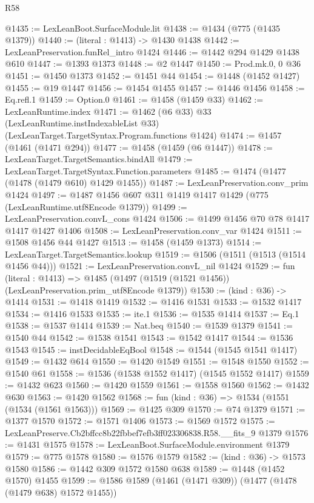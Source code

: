 \begin{lexlean}{R58}
\begin{coremodule}
{{@1435 := LexLeanBoot.SurfaceModule.lit
@1438 := @1434 (@775 (@1435 @1379))
@1440 := (literal : @1413) -> @1430 @1438
@1442 := LexLeanPreservation.funRel_intro @1424
@1446 := @1442 @294 @1429 @1438 @610
@1447 := @1393 @1373
@1448 := @2 @1447
@1450 := Prod.mk.{0, 0} @36
@1451 := @1450 @1373
@1452 := @1451 @44
@1454 := @1448 (@1452 @1427)
@1455 := @19 @1447
@1456 := @1454 @1455
@1457 := @1446 @1456
@1458 := Eq.refl.{1}
@1459 := Option.{0}
@1461 := @1458 (@1459 @33)
@1462 := LexLeanRuntime.index
@1471 := @1462
    (@6 @33)
    @33
    (LexLeanRuntime.instIndexableList @33)
    (LexLeanTarget.TargetSyntax.Program.functions @1424)
@1474 := @1457 (@1461 (@1471 @294))
@1477 := @1458 (@1459 (@6 @1447))
@1478 := LexLeanTarget.TargetSemantics.bindAll
@1479 := LexLeanTarget.TargetSyntax.Function.parameters
@1485 := @1474 (@1477 (@1478 (@1479 @610) @1429 @1455))
@1487 := LexLeanPreservation.conv_prim @1424
@1497 := @1487 @1456 @607 @311 @1419 @1417 @1429 (@775 (LexLeanRuntime.utf8Encode @1379))
@1499 := LexLeanPreservation.convL_cons @1424
@1506 := @1499 @1456 @70 @78 @1417 @1417 @1427 @1406
@1508 := LexLeanPreservation.conv_var @1424
@1511 := @1508 @1456 @44 @1427
@1513 := @1458 (@1459 @1373)
@1514 := LexLeanTarget.TargetSemantics.lookup
@1519 := @1506 (@1511 (@1513 (@1514 @1456 @44)))
@1521 := LexLeanPreservation.convL_nil @1424
@1529 := fun (literal : @1413) =>
  @1485 (@1497 (@1519 (@1521 @1456)) (LexLeanPreservation.prim_utf8Encode @1379))
@1530 := (kind : @36) -> @1414
@1531 := @1418 @1419
@1532 := @1416 @1531
@1533 := @1532 @1417
@1534 := @1416 @1533
@1535 := ite.{1}
@1536 := @1535 @1414
@1537 := Eq.{1}
@1538 := @1537 @1414
@1539 := Nat.beq
@1540 := @1539 @1379
@1541 := @1540 @44
@1542 := @1538 @1541
@1543 := @1542 @1417
@1544 := @1536 @1543
@1545 := instDecidableEqBool
@1548 := @1544 (@1545 @1541 @1417)
@1549 := @1432 @614
@1550 := @1420 @1549
@1551 := @1548 @1550
@1552 := @1540 @61
@1558 := @1536 (@1538 @1552 @1417) (@1545 @1552 @1417)
@1559 := @1432 @623
@1560 := @1420 @1559
@1561 := @1558 @1560
@1562 := @1432 @630
@1563 := @1420 @1562
@1568 := fun (kind : @36) => @1534 (@1551 (@1534 (@1561 @1563)))
@1569 := @1425 @309
@1570 := @74 @1379
@1571 := @1377 @1570
@1572 := @1571 @1406
@1573 := @1569 @1572
@1575 := LexLeanPreserve.Cb2bffcc8b22fbbef7efb3ff023306838.R58.__fits_9 @1379
@1576 := @1431 @1575
@1578 := LexLeanBoot.SurfaceModule.environment @1379
@1579 := @775 @1578
@1580 := @1576 @1579
@1582 := (kind : @36) -> @1573 @1580
@1586 := @1442 @309 @1572 @1580 @638
@1589 := @1448 (@1452 @1570) @1455
@1599 := @1586 @1589 (@1461 (@1471 @309)) (@1477 (@1478 (@1479 @638) @1572 @1455))
}}
\end{coremodule}
\end{lexlean}
